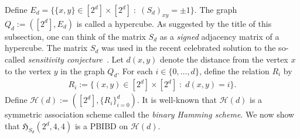 \documentclass[11pt]{article}
\begin{document}
Define $E_d = \{ \{x,y\} \in [2^d] \times [2^d] \; : \; (S_d)_{xy} = \pm 1 \}$.
The graph $Q_d := ([2^d],E_d)$ is called a hypercube.
As suggested by the title of this subsection, one can think of the matrix $S_d$ as a \emph{signed} adjacency matrix of a hypercube.
The matrix $S_d$ was used in the recent celebrated solution to the so-called \emph{sensitivity conjecture}~\cite{Huang}.
Let $d(x,y)$ denote the distance from the vertex $x$ to the vertex $y$ in the graph $Q_d$.
For each $i \in \{0,\dots,d\}$, define the relation $R_i$ by
\begin{align*}
R_i :=\{(x,y)\in [2^d]\times [2^d]  \; : \;  d(x,y)=i\}.
\end{align*}
Define $\mathcal H(d):=([2^d],\{R_i\}_{i=0}^d)$.
It is well-known that $\mathcal H(d)$ is a symmetric association scheme called the \emph{binary Hamming scheme}.
We now show that $\mathfrak H_{S_d}(2^d,4,4)$ is a PBIBD on $\mathcal H(d)$.
\end{document}
